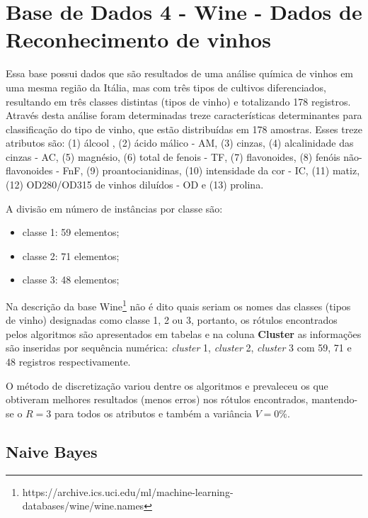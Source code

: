 

\section{Base de Dados 4 - Wine - Dados de Reconhecimento de vinhos}


Essa base \cite{Aeberhard1992} possui dados que são resultados de uma análise química de vinhos em uma mesma região da Itália, mas com três tipos de cultivos diferenciados, resultando em três classes distintas (tipos de vinho) e totalizando 178 registros. Através desta análise foram determinadas treze características determinantes para classificação do tipo de vinho, que estão distribuídas em 178 amostras. Esses treze atributos são: (1) álcool , (2) ácido málico - AM, (3) cinzas, (4) alcalinidade das cinzas - AC, (5) magnésio, (6) total de fenois - TF, (7) flavonoides, (8) fenóis não-flavonoides - FnF, (9) proantocianidinas, (10) intensidade da cor - IC, (11) matiz, (12) OD280/OD315 de vinhos diluídos - OD e (13) prolina. 

A divisão em número de instâncias por classe são:

\begin{itemize}[noitemsep]
 \item classe 1: 59 elementos;
 \item classe 2: 71 elementos;
 \item classe 3: 48 elementos;
\end{itemize}


Na descrição da base Wine\footnote{https://archive.ics.uci.edu/ml/machine-learning-databases/wine/wine.names} não é dito quais seriam os nomes das classes (tipos de vinho) designadas como classe 1, 2 ou 3, portanto, os rótulos encontrados pelos algoritmos são apresentados em tabelas e na coluna \textbf{Cluster} as informações são inseridas por sequência numérica: \textit{cluster} 1, \textit{cluster} 2, \textit{cluster} 3 com 59, 71 e 48 registros respectivamente. 

O método de discretização variou dentre os algoritmos e prevaleceu os que obtiveram melhores resultados (menos erros) nos rótulos encontrados, mantendo-se o  ${R=3}$  para todos os atributos e também a variância ${V=0\%}$. 

\subsection{Naive Bayes} \label{cap:resultados:ssec:wine:bayes}

